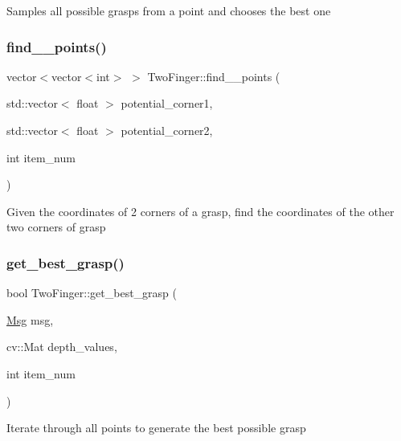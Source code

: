 Samples all possible grasps from a point and chooses the best one \mbox{\label{classTwoFinger_aaa139685eb927fad02edc52afde35a23}} 
\subsubsection{\texorpdfstring{find\+\_\+\_\+points()}{find\_2\_points()}}
{\footnotesize\ttfamily vector$<$vector$<$int$>$ $>$ Two\+Finger\+::find\+\_\+\_\+points (\begin{DoxyParamCaption}\item[{std\+::vector$<$ float $>$}]{potential\+\_\+corner1,  }\item[{std\+::vector$<$ float $>$}]{potential\+\_\+corner2,  }\item[{int}]{item\+\_\+num }\end{DoxyParamCaption})\hspace{0.3cm}{\ttfamily [inline]}}

Given the coordinates of 2 corners of a grasp, find the coordinates of the other two corners of grasp \mbox{\label{classTwoFinger_a4d2eda71d6d313d4b775636d45db1685}} 
\subsubsection{\texorpdfstring{get\+\_\+best\+\_\+grasp()}{get\_best\_grasp()}}
{\footnotesize\ttfamily bool Two\+Finger\+::get\+\_\+best\+\_\+grasp (\begin{DoxyParamCaption}\item[{\hyperlink{classMsg}{Msg}}]{msg,  }\item[{cv\+::\+Mat}]{depth\+\_\+values,  }\item[{int}]{item\+\_\+num }\end{DoxyParamCaption})\hspace{0.3cm}{\ttfamily [inline]}}

Iterate through all points to generate the best possible grasp \mbox{\label{classTwoFinger_a36ecc602dc5e27c172e62b71ed5d2577}} 
